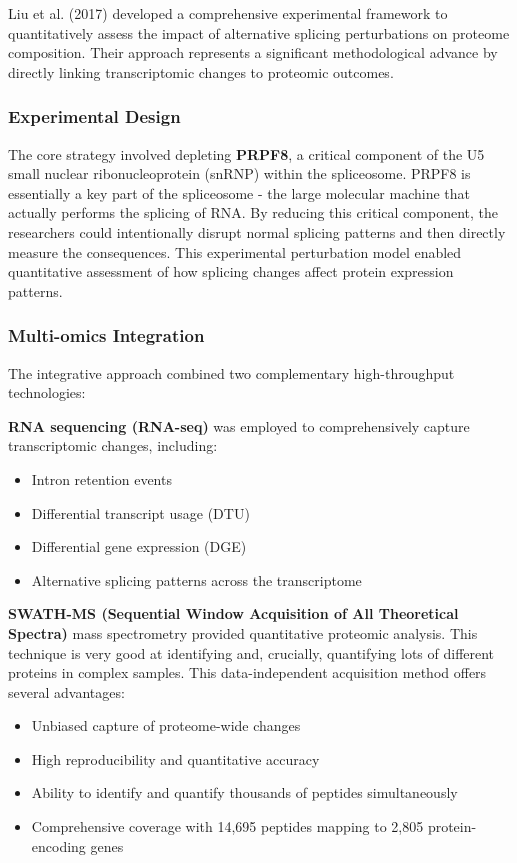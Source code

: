 \documentclass[12pt,a4paper]{article}
\begin{document}
Liu et al. (2017) developed a comprehensive experimental framework to quantitatively assess the impact of alternative splicing perturbations on proteome composition. Their approach represents a significant methodological advance by directly linking transcriptomic changes to proteomic outcomes.

\subsubsection{Experimental Design}

The core strategy involved depleting \textbf{PRPF8}, a critical component of the U5 small nuclear ribonucleoprotein (snRNP) within the spliceosome. PRPF8 is essentially a key part of the spliceosome - the large molecular machine that actually performs the splicing of RNA. By reducing this critical component, the researchers could intentionally disrupt normal splicing patterns and then directly measure the consequences. This experimental perturbation model enabled quantitative assessment of how splicing changes affect protein expression patterns.

\subsubsection{Multi-omics Integration}

The integrative approach combined two complementary high-throughput technologies:

\textbf{RNA sequencing (RNA-seq)} was employed to comprehensively capture transcriptomic changes, including:
\begin{itemize}
    \item Intron retention events
    \item Differential transcript usage (DTU)
    \item Differential gene expression (DGE)
    \item Alternative splicing patterns across the transcriptome
\end{itemize}

\textbf{SWATH-MS (Sequential Window Acquisition of All Theoretical Spectra)} mass spectrometry provided quantitative proteomic analysis. This technique is very good at identifying and, crucially, quantifying lots of different proteins in complex samples. This data-independent acquisition method offers several advantages:
\begin{itemize}
    \item Unbiased capture of proteome-wide changes
    \item High reproducibility and quantitative accuracy
    \item Ability to identify and quantify thousands of peptides simultaneously
    \item Comprehensive coverage with 14,695 peptides mapping to 2,805 protein-encoding genes
\end{itemize}
\end{document}
